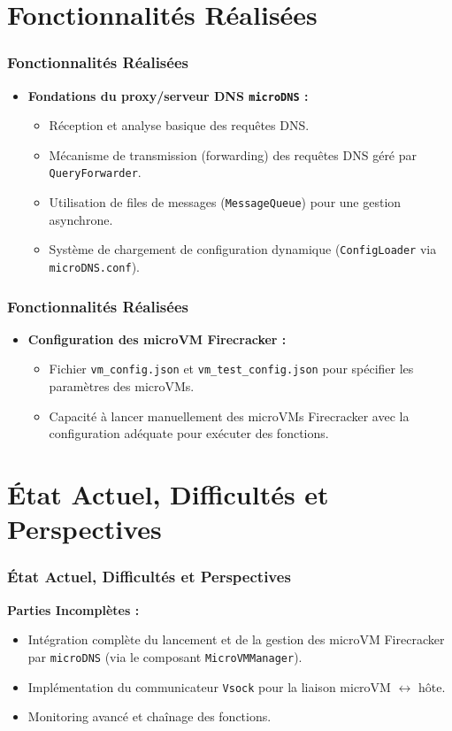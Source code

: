 \documentclass[12pt]{beamer}
\begin{document}
    \section{Fonctionnalités Réalisées}
	\begin{frame}
		\frametitle{Fonctionnalités Réalisées}
		\begin{itemize}
			\item \textbf{Fondations du proxy/serveur DNS \texttt{microDNS} :}
			\begin{itemize}
				\item Réception et analyse basique des requêtes DNS.
				\item Mécanisme de transmission (forwarding) des requêtes DNS géré par \texttt{QueryForwarder}.
				\item Utilisation de files de messages (\texttt{MessageQueue}) pour une gestion asynchrone.
				\item Système de chargement de configuration dynamique (\texttt{ConfigLoader} via \texttt{microDNS.conf}).
			\end{itemize}
		\end{itemize}
	\end{frame}

	\begin{frame}
		\frametitle{Fonctionnalités Réalisées}
		\begin{itemize}
			\item \textbf{Configuration des microVM Firecracker :}
			\begin{itemize}
				\item Fichier \texttt{vm\_config.json} et \texttt{vm\_test\_config.json} pour spécifier les paramètres des microVMs.
				\item Capacité à lancer manuellement des microVMs Firecracker avec la configuration adéquate pour exécuter des fonctions.
			\end{itemize}
		\end{itemize}
	\end{frame}

    \section{État Actuel, Difficultés et Perspectives}
	\begin{frame}
		\frametitle{État Actuel, Difficultés et Perspectives}
		\textbf{Parties Incomplètes :}
		\begin{itemize}
			\item Intégration complète du lancement et de la gestion des microVM Firecracker par \texttt{microDNS} (via le composant \texttt{MicroVMManager}).
			\item Implémentation du communicateur \texttt{Vsock} pour la liaison microVM $\leftrightarrow$ hôte.
			\item Monitoring avancé et chaînage des fonctions.
		\end{itemize}
	\end{frame}
\end{document}
